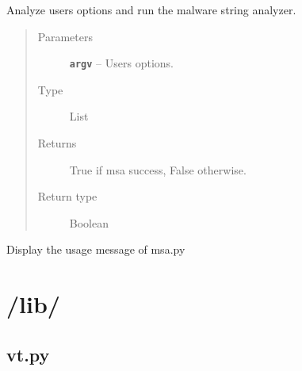 \documentclass[letterpaper,10pt,oneside]{sphinxmanual}
\begin{document}
\begin{fulllineitems}
\label{index:msa.start}
Analyze users options and run the malware string analyzer.
\begin{quote}\begin{description}
\item[{Parameters}] \leavevmode
\textbf{\texttt{argv}} -- Users options.

\item[{Type}] \leavevmode
List

\item[{Returns}] \leavevmode
True if msa success, False otherwise.

\item[{Return type}] \leavevmode
Boolean

\end{description}\end{quote}

\end{fulllineitems}


\begin{fulllineitems}
\label{index:msa.usage}
Display the usage message of msa.py

\end{fulllineitems}



\chapter{/lib/}
\label{index:lib}

\section{vt.py}
\label{index:module-lib.vt}\label{index:vt-py}
\end{document}
